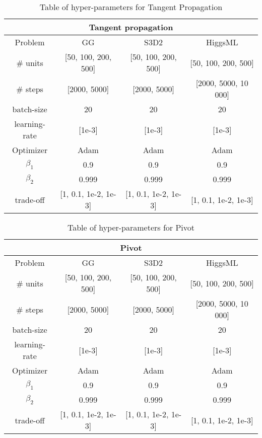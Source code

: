 \begin{table}[ht!]
\centering
\begin{tabular}{||c c c c||} 
 \hline
 \multicolumn{4}{|c|}{Tangent propagation}\\
 \hline
 Problem & GG & S3D2 & HiggsML \\ [0.5ex] 
 \hline
 \# units & [50, 100, 200, 500] & [50, 100, 200, 500] & [50, 100, 200, 500] \\ 
 \# steps & [2000, 5000] & [2000, 5000] & [2000, 5000, 10 000] \\
 batch-size &  20 &  20 & 20 \\
 learning-rate & [1e-3] & [1e-3] & [1e-3] \\
 Optimizer & Adam & Adam & Adam \\
 $\beta_1$ & 0.9 & 0.9 & 0.9 \\
 $\beta_2$ & 0.999 & 0.999 & 0.999 \\
 trade-off & [1, 0.1, 1e-2, 1e-3] & [1, 0.1, 1e-2, 1e-3] & [1, 0.1, 1e-2, 1e-3] \\
 \hline
\end{tabular}
\caption{Table of hyper-parameters for Tangent Propagation}
\label{table:HP_TP}
\end{table}


\begin{table}[ht!]
\centering
\begin{tabular}{||c c c c||} 
 \hline
 \multicolumn{4}{|c|}{Pivot}\\
 \hline
 Problem & GG & S3D2 & HiggsML \\ [0.5ex] 
 \hline
 \# units & [50, 100, 200, 500] & [50, 100, 200, 500] & [50, 100, 200, 500] \\ 
 \# steps & [2000, 5000] & [2000, 5000] & [2000, 5000, 10 000] \\
 batch-size &  20 &  20 & 20 \\
 learning-rate & [1e-3] & [1e-3] & [1e-3] \\
 Optimizer & Adam & Adam & Adam \\
 $\beta_1$ & 0.9 & 0.9 & 0.9 \\
 $\beta_2$ & 0.999 & 0.999 & 0.999 \\
 trade-off & [1, 0.1, 1e-2, 1e-3] & [1, 0.1, 1e-2, 1e-3] & [1, 0.1, 1e-2, 1e-3] \\
 \hline
\end{tabular}
\caption{Table of hyper-parameters for Pivot}
\label{table:HP_PIVOT}
\end{table}


